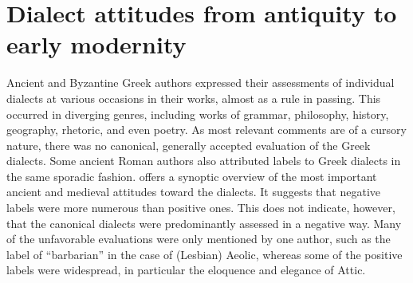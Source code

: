 \section{Dialect attitudes from antiquity to early modernity}\label{sec:7.2}


Ancient and Byzantine Greek authors expressed their assessments of individual dialects at various occasions in their works, almost as a rule in passing. This occurred in diverging genres, including works of grammar, philosophy, history, geography, rhetoric, and even poetry. As most relevant comments are of a cursory nature, there was no canonical, generally accepted evaluation of the Greek dialects. Some ancient Roman authors also attributed labels to Greek dialects in the same sporadic fashion.  offers a synoptic overview of the most important ancient and medieval attitudes toward the dialects. It suggests that negative labels were more numerous than positive ones. This does not indicate, however, that the canonical dialects were predominantly assessed in a negative way. Many of the unfavorable evaluations were only mentioned by one author, such as the label of “barbarian” in the case of (Lesbian) Aeolic, whereas some of the positive labels were widespread, in particular the eloquence and elegance of Attic.

